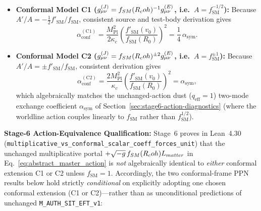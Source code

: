 \begin{itemize}
  \item \textbf{Conformal Model C1 ($g_{\mu\nu}^{(J)} = f_{SM}(R_coh)^{-1} g_{\mu\nu}^{(E)}$, i.e.\ $A = f_{\mathrm{SM}}^{-1/2}$):} Because $A'/A = -\frac{1}{2}f'_{\mathrm{SM}}/f_{\mathrm{SM}}$, consistent source and test-body derivation gives
  \begin{equation}
  \alpha_{\mathrm{conf}}^{(\mathrm{C1})} = \frac{M_{\mathrm{Pl}}^2}{2\kappa_c}\left(\frac{f'_{\mathrm{SM}}(v_0)}{f_{\mathrm{SM}}(R_0)}\right)^2 = \frac{1}{4}\,\alpha_{\mathrm{sym}}.
  \label{eq:alpha_conf_C1}
  \end{equation}
  \item \textbf{Conformal Model C2 ($g_{\mu\nu}^{(J)} = f_{SM}(R_coh)^{\pm 2} g_{\mu\nu}^{(E)}$, i.e.\ $A = f_{\mathrm{SM}}^{\pm 1}$):} Because $A'/A = \pm f'_{\mathrm{SM}}/f_{\mathrm{SM}}$, consistent derivation gives
  \begin{equation}
  \alpha_{\mathrm{conf}}^{(\mathrm{C2})} = \frac{2 M_{\mathrm{Pl}}^2}{\kappa_c}\left(\frac{f'_{\mathrm{SM}}(v_0)}{f_{\mathrm{SM}}(R_0)}\right)^2 = \alpha_{\mathrm{sym}},
  \label{eq:alpha_sym_exact}
  \end{equation}
  which algebraically matches the unchanged-action dust ($q_{\mathrm{eff}} = 1$) two-mode exchange coefficient $\alpha_{\mathrm{sym}}$ of Section~\ref{sec:stage6-action-diagnostics} (where the worldline action couples linearly to $f_{\mathrm{SM}}$ rather than $f_{\mathrm{SM}}^{1/2}$).
\end{itemize}
\textbf{Stage-6 Action-Equivalence Qualification:} Stage~6 proves in Lean~4.30 (\texttt{multiplicative\_\allowbreak{}vs\_\allowbreak{}conformal\_\allowbreak{}scalar\_\allowbreak{}coeff\_\allowbreak{}forces\_\allowbreak{}unit}) that the unchanged multiplicative portal $+\sqrt{-g}\,f_{SM}(R_coh)L_{matter}$ in Eq.~\eqref{eq:abstract_master_action} is \emph{not} algebraically identical to \emph{either} conformal extension C1 or C2 unless $f_{\mathrm{SM}} = 1$. Accordingly, the two conformal-frame PPN results below hold strictly \emph{conditional} on explicitly adopting one chosen conformal extension (C1 or C2)---rather than as unconditional predictions of unchanged \texttt{M\_AUTH\_SIT\_EFT\_v1}:
